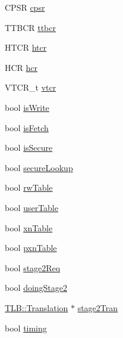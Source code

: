 \begin{DoxyCompactItemize}
\item 
CPSR \hyperlink{classArmISA_1_1TableWalker_1_1WalkerState_a6b3c25b83c785b300c59f7dce8881081}{cpsr}
\item 
TTBCR \hyperlink{classArmISA_1_1TableWalker_1_1WalkerState_ad6762be565087b4bfb87f5bcb42673e7}{ttbcr}
\item 
HTCR \hyperlink{classArmISA_1_1TableWalker_1_1WalkerState_a1ee934c0734a2ed4bd4d867f55aa3d97}{htcr}
\item 
HCR \hyperlink{classArmISA_1_1TableWalker_1_1WalkerState_ad0d8df2e2be956266458221c23763b4c}{hcr}
\item 
VTCR\_\-t \hyperlink{classArmISA_1_1TableWalker_1_1WalkerState_a284bfeb0db142a055935ae3d133893d1}{vtcr}
\item 
bool \hyperlink{classArmISA_1_1TableWalker_1_1WalkerState_a0775ef609f39793da4e2adb3a0e2ded1}{isWrite}
\item 
bool \hyperlink{classArmISA_1_1TableWalker_1_1WalkerState_aa863dbd5a3e20baa5acb07e373c42ddc}{isFetch}
\item 
bool \hyperlink{classArmISA_1_1TableWalker_1_1WalkerState_a62bc84f4251f16cf0cfa0f8d96e00c37}{isSecure}
\item 
bool \hyperlink{classArmISA_1_1TableWalker_1_1WalkerState_aa8accf2e55a1d194420c61e85b53efb5}{secureLookup}
\item 
bool \hyperlink{classArmISA_1_1TableWalker_1_1WalkerState_a419a9be86581a6eba5d7f4a22f0f6e76}{rwTable}
\item 
bool \hyperlink{classArmISA_1_1TableWalker_1_1WalkerState_ab4be9ffb2fe22576e2f587374fdd20e6}{userTable}
\item 
bool \hyperlink{classArmISA_1_1TableWalker_1_1WalkerState_a34b92e09eece01cfa45e9b9d0b7f74c6}{xnTable}
\item 
bool \hyperlink{classArmISA_1_1TableWalker_1_1WalkerState_a92af2e7b7b80463a6bbf8ccead3af087}{pxnTable}
\item 
bool \hyperlink{classArmISA_1_1TableWalker_1_1WalkerState_a52120124577a3b7c28a4e8876cd36a8b}{stage2Req}
\item 
bool \hyperlink{classArmISA_1_1TableWalker_1_1WalkerState_a8277e995719b58e8da5a0aa5bba2e623}{doingStage2}
\item 
\hyperlink{classBaseTLB_1_1Translation}{TLB::Translation} $\ast$ \hyperlink{classArmISA_1_1TableWalker_1_1WalkerState_ab65d5f856546ee4e3a9610df9672d39a}{stage2Tran}
\item 
bool \hyperlink{classArmISA_1_1TableWalker_1_1WalkerState_a20f65ad56869382ed8681b9dd1aa85d6}{timing}

\end{DoxyCompactItemize}
